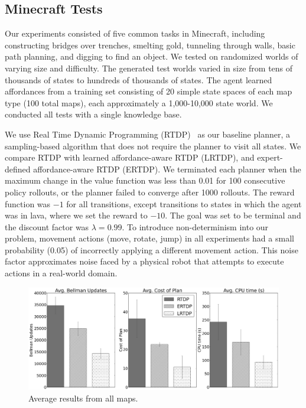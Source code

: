 \documentclass[letterpaper]{article}
\begin{document}
\subsection{Minecraft Tests}

Our experiments consisted of five common tasks in Minecraft, including
constructing bridges over trenches, smelting gold, tunneling through
walls, basic path planning, and digging to find an object.  We tested
on randomized worlds of varying size and difficulty. The generated
test worlds varied in size from tens of thousands of states to
hundreds of thousands of states.  The agent learned affordances from a
training set consisting of 20 simple state spaces of each map type
(100 total maps), each approximately a 1,000-10,000 state world. We
conducted all tests with a single knowledge base.

We use Real Time Dynamic Programming (RTDP)~\cite{barto95} as our
baseline planner, a sampling-based algorithm that does not require the
planner to visit all states. We compare RTDP with learned
affordance-aware RTDP (LRTDP), and expert-defined affordance-aware
RTDP (ERTDP). We terminated each planner when the maximum change in
the value function was less than 0.01 for 100 consecutive policy
rollouts, or the planner failed to converge after 1000 rollouts.  The
reward function was $-1$ for all transitions, except transitions to
states in which the agent was in lava, where we set the reward to
$-10$. The goal was set to be terminal and the discount factor was
$\lambda = 0.99$.  To introduce non-determinism into our problem,
movement actions (move, rotate, jump) in all experiments had a small
probability (0.05) of incorrectly applying a different movement
action.  This noise factor approximates noise faced by a physical
robot that attempts to execute actions in a real-world domain.

\begin{figure}[t]
\centering
\includegraphics[width=1\linewidth]{figures/average_results_cropped.png}%
\caption{Average results from all maps.}
\label{fig:average_results}
\end{figure}
\end{document}
